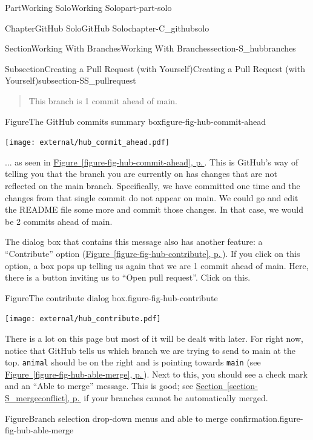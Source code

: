 \documentclass[twoside,10pt,]{book}
\newcommand{\xreffont}{\relax}
\newcommand{\mono}[1]{\texttt{#1}}
\begin{document}
\begin{partptx}{Part}{Working Solo}{}{Working Solo}{}{}{part-part-solo}
\begin{chapterptx}{Chapter}{GitHub Solo}{}{GitHub Solo}{}{}{chapter-C_githubsolo}
\begin{sectionptx}{Section}{Working With Branches}{}{Working With Branches}{}{}{section-S_hubbranches}
\begin{subsectionptx}{Subsection}{Creating a Pull Request (with Yourself)}{}{Creating a Pull Request (with Yourself)}{}{}{subsection-SS_pullrequest}
\begin{quote}%
This branch is 1 commit ahead of main.%
\end{quote}
\begin{figureptx}{Figure}{The GitHub commits summary box}{figure-fig-hub-commit-ahead}{}%
\begin{image}{0.05}{0.9}{0.05}{}%
\texttt{[image: external/hub\_commit\_ahead.pdf]}
\end{image}%
\tcblower
\end{figureptx}%
... as seen in \hyperref[figure-fig-hub-commit-ahead]{Figure~{\xreffont\ref{figure-fig-hub-commit-ahead}}, p.\,\pageref{figure-fig-hub-commit-ahead}}. This is GitHub's way of telling you that the branch you are currently on has changes that are not reflected on the main branch. Specifically, we have committed one time and the changes from that single commit do not appear on main. We could go and edit the README file some more and commit those changes. In that case, we would be 2 commits ahead of main.%
\par
The dialog box that contains this message also has another feature: a ``Contribute'' option (\hyperref[figure-fig-hub-contribute]{Figure~{\xreffont\ref{figure-fig-hub-contribute}}, p.\,\pageref{figure-fig-hub-contribute}}). If you click on this option, a box pops up telling us again that we are 1 commit ahead of main. Here, there is a button inviting us to ``Open pull request''. Click on this.%
\begin{figureptx}{Figure}{The contribute dialog box.}{figure-fig-hub-contribute}{}%
\begin{image}{0.25}{0.5}{0.25}{}%
\texttt{[image: external/hub\_contribute.pdf]}
\end{image}%
\tcblower
\end{figureptx}%
There is a lot on this page but most of it will be dealt with later. For right now, notice that GitHub tells us which branch we are trying to send to main at the top. \mono{animal} should be on the right and is pointing towards \mono{main} (see \hyperref[figure-fig-hub-able-merge]{Figure~{\xreffont\ref{figure-fig-hub-able-merge}}, p.\,\pageref{figure-fig-hub-able-merge}}). Next to this, you should see a check mark and an ``Able to merge'' message. This is good; see \hyperref[section-S_mergeconflict]{Section~{\xreffont\ref{section-S_mergeconflict}}, p.\,\pageref{section-S_mergeconflict}} if your branches cannot be automatically merged.%
\begin{figureptx}{Figure}{Branch selection drop-down menus and able to merge confirmation.}{figure-fig-hub-able-merge}{}%

\end{figureptx}
\end{subsectionptx}
\end{sectionptx}
\end{chapterptx}
\end{partptx}
\end{document}
